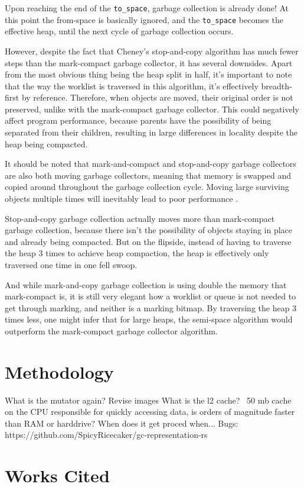 \documentclass[index]{subfiles}
\begin{document}
Upon reaching the end of the \verb+to_space+, garbage collection is already done! At this point the from-space is basically ignored, and the \verb+to_space+ becomes the effective heap, until the next cycle of garbage collection occurs.

However, despite the fact that Cheney's stop-and-copy algorithm has much fewer steps than the mark-compact garbage collector, it has several downsides. Apart from the most obvious thing being the heap split in half, it's important to note that the way the worklist is traversed in this algorithm, it's effectively breadth-first by reference. Therefore, when objects are moved, their original order is not preserved, unlike with the mark-compact garbage collector. This could negatively affect program performance, because parents have the possibility of being separated from their children, resulting in large differences in locality despite the heap being compacted.

It should be noted that mark-and-compact and stop-and-copy garbage collectors are also both moving garbage collectors, meaning that memory is swapped and copied around throughout the garbage collection cycle. Moving large surviving objects multiple times will inevitably lead to poor performance \cite[Chapter 4]{gc_handbook}.

Stop-and-copy garbage collection actually moves more than mark-compact garbage collection, because there isn't the possibility of objects staying in place and already being compacted. But on the flipside, instead of having to traverse the heap 3 times to achieve heap compaction, the heap is effectively only traversed one time in one fell swoop.

And while mark-and-copy garbage collection is using double the memory that mark-compact is, it is still very elegant how a worklist or queue is not needed to  get through marking, and neither is a marking bitmap. By traversing the heap 3 times less, one might infer that for large heaps, the semi-space algorithm would outperform the mark-compact garbage collector algorithm.

\section{Methodology}

What is the mutator again?
Revise images
What is the l2 cache?
~50 mb cache on the CPU responsible for quickly accessing data, is orders of magnitude faster than RAM or harddrive?
When does it get proced when...
Bugs: https://github.com/SpicyRicecaker/gc-representation-rs

\section{Works Cited}

\printbibliography
\end{document}
